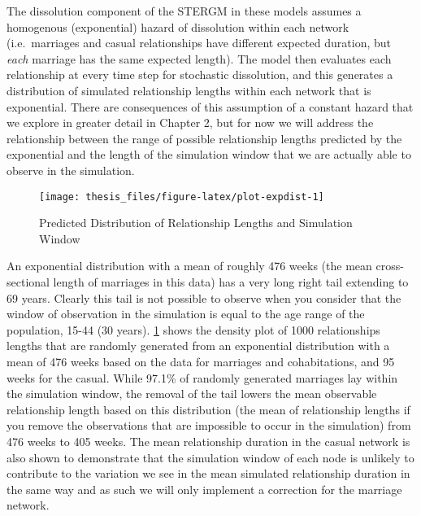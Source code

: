 \documentclass [11pt, proquest] {uwthesis}[2015/03/03]
\begin{document}
The dissolution component of the STERGM in these models assumes a homogenous (exponential) hazard of dissolution within each network (i.e.~marriages and casual relationships have different expected duration, but \emph{each} marriage has the same expected length). The model then evaluates each relationship at every time step for stochastic dissolution, and this generates a distribution of simulated relationship lengths within each network that is exponential. There are consequences of this assumption of a constant hazard that we explore in greater detail in Chapter 2, but for now we will address the relationship between the range of possible relationship lengths predicted by the exponential and the length of the simulation window that we are actually able to observe in the simulation.
\begin{figure}

{\centering \texttt{[image: thesis\_files/figure-latex/plot-expdist-1]} 

}

\caption{Predicted Distribution of Relationship Lengths and Simulation Window}\label{fig:plot-expdist}
\end{figure}
An exponential distribution with a mean of roughly 476 weeks (the mean cross-sectional length of marriages in this data) has a very long right tail extending to 69 years. Clearly this tail is not possible to observe when you consider that the window of observation in the simulation is equal to the age range of the population, 15-44 (30 years). \ref{fig:plot-expdist} shows the density plot of 1000 relationships lengths that are randomly generated from an exponential distribution with a mean of 476 weeks based on the data for marriages and cohabitations, and 95 weeks for the casual. While 97.1\% of randomly generated marriages lay within the simulation window, the removal of the tail lowers the mean observable relationship length based on this distribution (the mean of relationship lengths if you remove the observations that are impossible to occur in the simulation) from 476 weeks to 405 weeks. The mean relationship duration in the casual network is also shown to demonstrate that the simulation window of each node is unlikely to contribute to the variation we see in the mean simulated relationship duration in the same way and as such we will only implement a correction for the marriage network.
\end{document}
